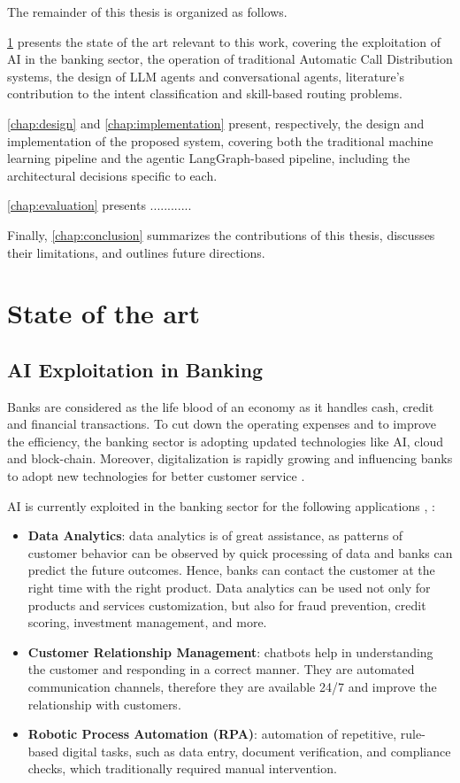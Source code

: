 \documentclass[12pt,a4paper,openright,twoside]{book}
\begin{document}
The remainder of this thesis is organized as follows.

\cref{chap:state-of-the-art} presents the state of the art relevant to this work, covering the exploitation of AI in the banking sector,
the operation of traditional Automatic Call Distribution systems, the design of LLM agents and conversational agents,
literature's contribution to the intent classification and skill-based routing problems.

\cref{chap:design} and \cref{chap:implementation} present, respectively, the design and implementation of the proposed system,
covering both the traditional machine learning pipeline and the agentic LangGraph-based pipeline,
including the architectural decisions specific to each.

\cref{chap:evaluation} presents ............

Finally, \cref{chap:conclusion} summarizes the contributions of this thesis, discusses their limitations,
and outlines future directions.

\chapter{State of the art}
\label{chap:state-of-the-art}


\section{AI Exploitation in Banking}

Banks are considered as the life blood of an economy as it handles cash, credit and financial transactions.
To cut down the operating expenses and to improve the efficiency, the banking sector is adopting updated technologies
like AI, cloud and block-chain. Moreover, digitalization is rapidly growing and influencing banks to adopt new
technologies for better customer service \cite{kochhar2019rise}.

AI is currently exploited in the banking sector for the following applications \cite{kochhar2019rise}, \cite{jain2023role}:
\begin{itemize}
    \item \textbf{Data Analytics}: data analytics is of great assistance, as patterns of customer behavior can be observed by quick processing of data and banks can predict the future outcomes. Hence, banks can contact the customer at the right time with the right product. Data analytics can be used not only for products and services customization, but also for fraud prevention, credit scoring, investment management, and more.
    \item \textbf{Customer Relationship Management}: chatbots help in understanding the customer and responding in a correct manner. They are automated communication channels, therefore they are available 24/7 and improve the relationship with customers.
    \item \textbf{Robotic Process Automation (RPA)}: automation of repetitive, rule-based digital tasks, such as data entry, document verification, and compliance checks, which traditionally required manual intervention.
\end{itemize}
\end{document}
